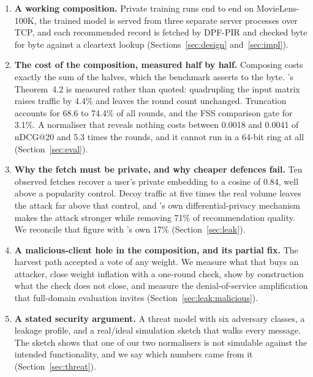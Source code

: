 \begin{enumerate}
  \item \textbf{A working composition.} Private training runs end to end on
    MovieLens-100K, the trained model is served from three separate server
    processes over TCP, and each recommended record is fetched by DPF-PIR and
    checked byte for byte against a cleartext lookup
    (Sections~\ref{sec:design} and~\ref{sec:impl}).

  \item \textbf{The cost of the composition, measured half by half.} Composing
    costs exactly the sum of the halves, which the benchmark asserts to the
    byte. \nudgeplain{}'s Theorem~4.2 is measured rather than quoted:
    quadrupling the input matrix raises traffic by 4.4\% and leaves the round
    count unchanged. Truncation accounts for 68.6 to 74.4\% of all rounds, and
    the FSS comparison gate for 3.1\%. A normaliser that reveals nothing costs
    between 0.0018 and 0.0041 of nDCG@20 and 5.3 times the rounds, and it
    cannot run in a 64-bit ring at all (Section~\ref{sec:eval}).

  \item \textbf{Why the fetch must be private, and why cheaper defences fail.}
    Ten observed fetches recover a user's private embedding to a cosine of
    0.84, well above a popularity control. Decoy traffic at five times the
    real volume leaves the attack far above that control, and \nudgeplain{}'s
    own differential-privacy mechanism makes the attack stronger while
    removing 71\% of recommendation quality. We reconcile that figure with
    \nudgeplain{}'s own 17\% (Section~\ref{sec:leak}).

  \item \textbf{A malicious-client hole in the composition, and its partial
    fix.} The harvest path accepted a vote of any weight. We measure what that
    buys an attacker, close weight inflation with a one-round check, show by
    construction what the check does not close, and measure the
    denial-of-service amplification that full-domain evaluation invites
    (Section~\ref{sec:leak:malicious}).

  \item \textbf{A stated security argument.} A threat model with six adversary
    classes, a leakage profile, and a real/ideal simulation sketch that walks
    every message. The sketch shows that one of our two normalisers is not
    simulable against the intended functionality, and we say which numbers
    came from it (Section~\ref{sec:threat}).
\end{enumerate}

